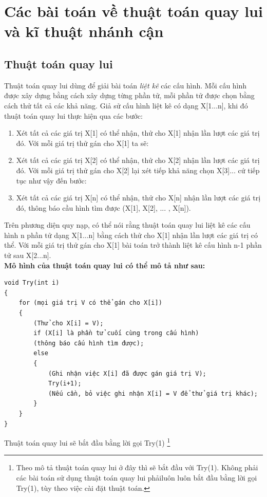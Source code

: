 \documentclass[a4paper,12pt]{report}
\begin{document}
\section{Các bài toán về thuật toán quay lui và kĩ thuật nhánh cận}
\subsection{Thuật toán quay lui}
Thuật toán quay lui dùng để giải bài toán \emph{liệt kê} các cấu hình. Mỗi cấu hình được xây dựng bằng cách xây dựng từng phần tử, mỗi phần tử được chọn bằng cách thử tất cả các khả năng. Giả sử cấu hình liệt kê có dạng X[1...n], khi đó thuật toán quay lui thực hiện qua các bước:
\begin{enumerate}
\item Xét tất cả các giá trị X[1] có thể nhận, thử cho X[1] nhận lần lượt các giá trị đó. Với mỗi giá trị thử gán cho X[1] ta sẽ:
\item Xét tất cả các giá trị X[2] có thể nhận, thử cho X[2] nhận lần lượt các giá trị đó. Với mỗi giá trị thử gán cho X[2] lại xét tiếp khả năng chọn X[3]... cứ tiếp tục như vậy đến bước:
\item Xét tất cả các giá trị X[n] có thể nhận, thử cho X[n] nhận lần lượt các giá trị đó, thông báo cầu hình tìm được (X[1], X[2], ... , X[n]).
\end{enumerate}

Trên phương diện quy nạp, có thể nói rằng thuật toán quay lui liệt kê các cấu hình n phần tử dạng X[1...n] bằng cách thử cho X[1] nhận lần lượt các giá trị có thể. Với mỗi giá trị thử gán cho X[1] bài toán trở thành liệt kê cấu hình n-1 phần tử sau X[2...n].\\

\textbf{Mô hình của thuật toán quay lui có thể mô tả như sau:}

\begin{verbatim}
void Try(int i)
{
    for (mọi giá trị V có thể gán cho X[i])
    {
        (Thử cho X[i] = V);
        if (X[i] là phần tử cuối cùng trong cấu hình)
        (thông báo cấu hình tìm được);
        else
        {
            (Ghi nhận việc X[i] đã được gán giá trị V);
            Try(i+1);
            (Nếu cần, bỏ việc ghi nhận X[i] = V để thử giá trị khác);
        }
    }
}
\end{verbatim}

Thuật toán quay lui sẽ bắt đầu bằng lời gọi Try(1) \footnote{Theo mô tả thuật toán quay lui ở đây thì sẽ bắt đầu với Try(1). Không phải các bài toán sử dụng thuật toán quay lui phảiluôn luôn bắt đầu bằng lời gọi Try(1), tùy theo việc cài đặt thuật toán.}
\end{document}
